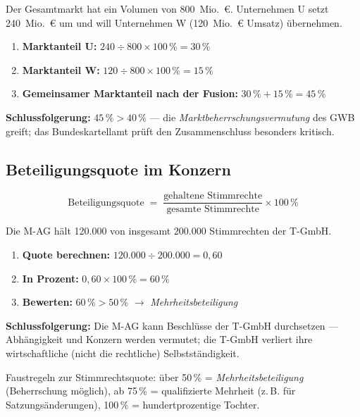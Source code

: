 \documentclass[11pt, a4paper]{article}
\begin{document}
\begin{beispiel}[title={Rechenbeispiel: Marktanteile bei einer geplanten Fusion}]
Der Gesamtmarkt hat ein Volumen von 800~Mio.~€. Unternehmen U setzt 240~Mio.~€ um und
will Unternehmen W (120~Mio.~€ Umsatz) übernehmen.
\begin{enumerate}
  \item \textbf{Marktanteil U:} $240 \div 800 \times 100\,\% = 30\,\%$
  \item \textbf{Marktanteil W:} $120 \div 800 \times 100\,\% = 15\,\%$
  \item \textbf{Gemeinsamer Marktanteil nach der Fusion:} $30\,\% + 15\,\% = 45\,\%$
\end{enumerate}
\textbf{Schlussfolgerung:} $45\,\% > 40\,\%$ --- die
\emph{Marktbeherrschungsvermutung} des GWB greift; das Bundeskartellamt prüft den
Zusammenschluss besonders kritisch.
\end{beispiel}

\subsection{Beteiligungsquote im Konzern}

\[
\textrm{Beteiligungsquote} \;=\; \frac{\textrm{gehaltene Stimmrechte}}{\textrm{gesamte Stimmrechte}} \times 100\,\%
\]

\begin{beispiel}[title={Rechenbeispiel: Mehrheitsbeteiligung}]
Die M-AG hält 120.000 von insgesamt 200.000 Stimmrechten der T-GmbH.
\begin{enumerate}
  \item \textbf{Quote berechnen:} $120.000 \div 200.000 = 0{,}60$
  \item \textbf{In Prozent:} $0{,}60 \times 100\,\% = 60\,\%$
  \item \textbf{Bewerten:} $60\,\% > 50\,\%$ $\rightarrow$ \emph{Mehrheitsbeteiligung}
\end{enumerate}
\textbf{Schlussfolgerung:} Die M-AG kann Beschlüsse der T-GmbH durchsetzen ---
Abhängigkeit und Konzern werden vermutet; die T-GmbH verliert ihre wirtschaftliche
(nicht die rechtliche) Selbstständigkeit.
\end{beispiel}

\begin{merksatz}
Faustregeln zur Stimmrechtsquote: über 50\,\% = \emph{Mehrheitsbeteiligung}
(Beherrschung möglich), ab 75\,\% = qualifizierte Mehrheit (z.\,B. für
Satzungsänderungen), 100\,\% = hundertprozentige Tochter.
\end{merksatz}
\end{document}
